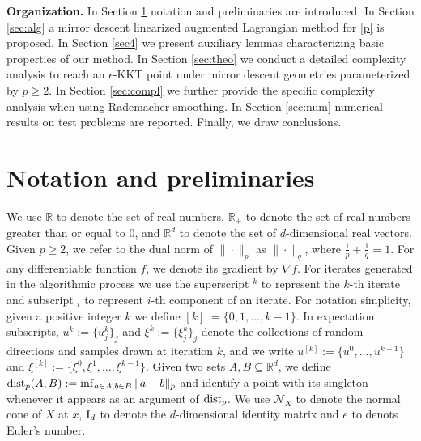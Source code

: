 \documentclass[11pt]{article}
\numberwithin{equation}{section}
\newcommand{\R}{\mathbb{R}}
\begin{document}
{\bf Organization.} 
In Section \ref{sec:not} notation and preliminaries are introduced. In Section \ref{sec:alg}  a mirror descent linearized augmented Lagrangian method for \eqref{p} is proposed.  In Section \ref{sec4} we present auxiliary lemmas characterizing basic properties of our method. In Section \ref{sec:theo} we conduct a detailed complexity analysis to reach an \(\epsilon\)-KKT point under mirror descent geometries parameterized by $p \ge 2$. In Section \ref{sec:compl} we further provide the specific complexity analysis when using {Rademacher smoothing}.
In Section \ref{sec:num}  numerical results on test problems are reported. Finally, we draw conclusions.


\section{Notation and preliminaries} \label{sec:not}
We use \(\R\) to denote the set of real numbers, \(\R_+\) to denote the set of real numbers greater than or equal to \(0\), and \(\R^d\) to denote the set of \(d\)-dimensional real vectors. Given \(p \ge 2\), we refer to the dual norm of $\|\cdot\|_p$ as $\|\cdot\|_q$, where {$ \frac{1}{p}+ \frac{1}{q}=1$}. For any differentiable function $f$, we denote its gradient by $\nabla f$. 
For iterates generated in the algorithmic process we use the superscript $^k$ to represent the $k$-th iterate and subscript $_i$ to represent $i$-th component of an iterate.
For notation simplicity, given a positive integer $k$ we define $[k] := \{0, 1, \dots, k-1\}$. In expectation subscripts, $u^k:=\{u_j^k\}_j$ and $\xi^k:=\{\xi_j^k\}_j$ denote the collections of random directions and samples drawn at iteration $k$, and we write $u^{[k]}:=\{u^0,\ldots,u^{k-1}\}$ and $\xi^{[k]} := \{\xi^0, \xi^1, \dots, \xi^{k-1}\}$.  Given two sets $A,B \subseteq \R^d$, we define ${\rm dist}_p(A,B) := \inf_{a \in A, b \in B}\|a-b\|_p$ and identify a point with its singleton whenever it appears as an argument of ${\rm dist}_p$. We use \(\mathcal{N}_X\) to denote the normal cone of \(X\) at \(x\), ${\rm I}_d$ to denote the $d$-dimensional identity matrix and $e$ to denots Euler's number.
\end{document}
